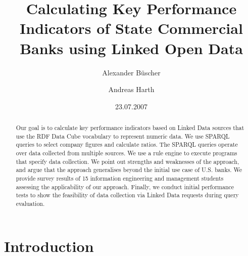 \documentclass[runningheads]{llncs}
\title{Calculating Key Performance Indicators of State Commercial Banks using Linked Open Data}
\author{Alexander B\"uscher \and Andreas Harth}
\institute{%
  Karlsruhe Institute of Technology (KIT), Germany
  \\
  \email{alexander.buescher@inwi.org, harth@kit.edu}
}
\date{23.07.2007}
\begin{document}
\maketitle

\begin{abstract}
  Our goal is to calculate key performance indicators based on Linked Data sources that use the RDF Data Cube vocabulary to represent numeric data.
  We use SPARQL queries to select company figures and calculate ratios.
  The SPARQL queries operate over data collected from multiple sources.
  We use a rule engine to execute programs that specify data collection.
  We point out strengths and weaknesses of the approach, and argue that the approach generalises beyond the initial use case of U.S. banks.
  We provide survey results of 15 information engineering and management students assessing the applicability of our approach.
  Finally, we conduct initial performance tests to show the feasibility of data collection via Linked Data requests during query evaluation.
\end{abstract}

\section{Introduction}
\end{document}
